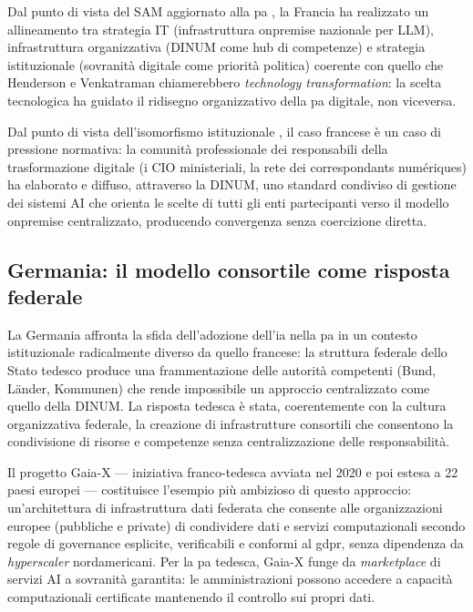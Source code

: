 Dal punto di vista del SAM aggiornato alla \gls{pa} \parencite{CordeiroSAM2019},
la Francia ha realizzato un allineamento tra strategia IT (infrastruttura
\gls{onpremise} nazionale per LLM), infrastruttura organizzativa (DINUM come
hub di competenze) e strategia istituzionale (sovranità digitale come priorità
politica) coerente con quello che Henderson e Venkatraman chiamerebbero
\textit{technology transformation}: la scelta tecnologica ha guidato il
ridisegno organizzativo della \gls{pa} digitale, non viceversa.

Dal punto di vista dell'isomorfismo istituzionale \parencite{DiMaggioPow1983},
il caso francese è un caso di pressione normativa: la comunità professionale
dei responsabili della trasformazione digitale (i CIO ministeriali, la rete dei
correspondants numériques) ha elaborato e diffuso, attraverso la DINUM,
uno standard condiviso di gestione dei sistemi AI che orienta le scelte di tutti
gli enti partecipanti verso il modello \gls{onpremise} centralizzato, producendo
convergenza senza coercizione diretta.

\subsection{Germania: il modello consortile come risposta federale}

La Germania affronta la sfida dell'adozione dell'\gls{ia} nella \gls{pa} in un contesto
istituzionale radicalmente diverso da quello francese: la struttura federale
dello Stato tedesco produce una frammentazione delle autorità competenti
(Bund, Länder, Kommunen) che rende impossibile un approccio centralizzato come
quello della DINUM. La risposta tedesca è stata, coerentemente con la cultura
organizzativa federale, la creazione di infrastrutture consortili che
consentono la condivisione di risorse e competenze senza centralizzazione
delle responsabilità.

Il progetto Gaia-X \parencite{GaiaX2025} --- iniziativa franco-tedesca
avviata nel 2020 e poi estesa a 22 paesi europei --- costituisce l'esempio più
ambizioso di questo approccio: un'architettura di infrastruttura dati federata
che consente alle organizzazioni europee (pubbliche e private) di condividere
dati e servizi computazionali secondo regole di governance esplicite, verificabili
e conformi al \gls{gdpr}, senza dipendenza da \textit{hyperscaler} nordamericani.
Per la \gls{pa} tedesca, Gaia-X funge da \textit{marketplace} di servizi AI a sovranità
garantita: le amministrazioni possono accedere a capacità computazionali certificate
mantenendo il controllo sui propri dati.

